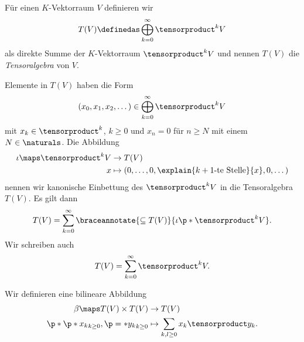 \begin{definition*}
  Für einen \( K \)-Vektorraum \( V \) definieren wir
  \begin{equation*}
    T(V)\definedas \bigoplus_{k=0}^\infty \tensorproduct^k V
  \end{equation*}
  als direkte Summe der \( K \)-Vektorraum \( \tensorproduct^k V \) und nennen \( T(V) \) die \emph{Tensoralgebra} von \( V \).
\end{definition*}
\begin{bemerkung*}
  Elemente in \( T(V) \) haben die Form
  \begin{equation*}
    (x_0,x_1,x_2,\dotsc)\in \bigoplus_{k=0}^{\infty} \tensorproduct^k V
  \end{equation*}
  mit \( x_k\in \tensorproduct^k  \), \( k\geq 0 \) und \( x_n=0 \) für \( n\geq N \) mit einem \( N\in \naturals \). Die Abbildung 
  \begin{align*}
    \iota\maps \tensorproduct^k V&\to T(V)\\
    x&\mapsto (0,\dotsc,0,\explain{\text{\( k+1 \)-te Stelle}}{x},0,\dotsc)
  \end{align*}
  nennen wir kanonische Einbettung des \( \tensorproduct^k V \) in die Tensoralgebra \( T(V) \). Es gilt dann
  \begin{equation*}
    T(V)=\sum_{k=0}^{\infty}\braceannotate{\subseteq T(V)}{\iota\p*{\tensorproduct^k V}}.
  \end{equation*}
  Wir schreiben auch
  \begin{equation*}
    T(V)=\sum_{k=0}^{\infty}\tensorproduct^k V.
  \end{equation*}
\end{bemerkung*}
\begin{definition*}
  Wir definieren eine bilineare Abbildung
  \begin{align*}
    \beta\maps T(V)\times T(V)&\to T(V)\\
    \p*{\p*{x_k}_{k\geq 0},\p=*{y_k}_{k\geq 0}}&\mapsto \sum_{k,l\geq 0}x_k \tensorproduct y_k.
  \end{align*}
\end{definition*}
